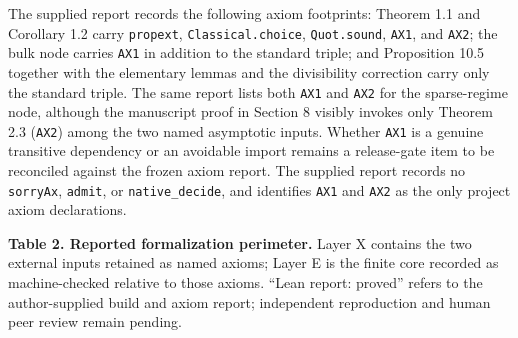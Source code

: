 \documentclass[
  11pt,
]{article}
\begin{document}
The supplied report records the following axiom footprints: Theorem 1.1 and Corollary 1.2 carry \texttt{propext}, \texttt{Classical.choice}, \texttt{Quot.sound}, \texttt{AX1}, and \texttt{AX2}; the bulk node carries \texttt{AX1} in addition to the standard triple; and Proposition 10.5 together with the elementary lemmas and the divisibility correction carry only the standard triple. The same report lists both \texttt{AX1} and \texttt{AX2} for the sparse-regime node, although the manuscript proof in Section 8 visibly invokes only Theorem 2.3 (\texttt{AX2}) among the two named asymptotic inputs. Whether \texttt{AX1} is a genuine transitive dependency or an avoidable import remains a release-gate item to be reconciled against the frozen axiom report. The supplied report records no \texttt{sorryAx}, \texttt{admit}, or \texttt{native\_decide}, and identifies \texttt{AX1} and \texttt{AX2} as the only project axiom declarations.

\textbf{Table 2. Reported formalization perimeter.} Layer X contains the two external inputs retained as named axioms; Layer E is the finite core recorded as machine-checked relative to those axioms. ``Lean report: proved'' refers to the author-supplied build and axiom report; independent reproduction and human peer review remain pending.
\end{document}
